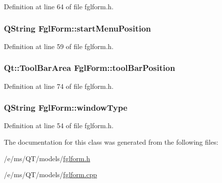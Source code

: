 Definition at line 64 of file fglform.h.

\hypertarget{classFglForm_aec7035cbd1e5a013f2d96a1a3a98aa53}{
\subsubsection[{startMenuPosition}]{\setlength{\rightskip}{0pt plus 5cm}QString FglForm::startMenuPosition}}
\label{classFglForm_aec7035cbd1e5a013f2d96a1a3a98aa53}


Definition at line 59 of file fglform.h.

\hypertarget{classFglForm_afc1641787bae0be3864cce6efdea9e17}{
\subsubsection[{toolBarPosition}]{\setlength{\rightskip}{0pt plus 5cm}Qt::ToolBarArea FglForm::toolBarPosition}}
\label{classFglForm_afc1641787bae0be3864cce6efdea9e17}


Definition at line 74 of file fglform.h.

\hypertarget{classFglForm_a5262a92dfdf82913701d4661bbefaaac}{
\subsubsection[{windowType}]{\setlength{\rightskip}{0pt plus 5cm}QString FglForm::windowType}}
\label{classFglForm_a5262a92dfdf82913701d4661bbefaaac}


Definition at line 54 of file fglform.h.



The documentation for this class was generated from the following files:\begin{DoxyCompactItemize}
\item 
/e/ms/QT/models/\hyperlink{fglform_8h}{fglform.h}\item 
/e/ms/QT/models/\hyperlink{fglform_8cpp}{fglform.cpp}\end{DoxyCompactItemize}
